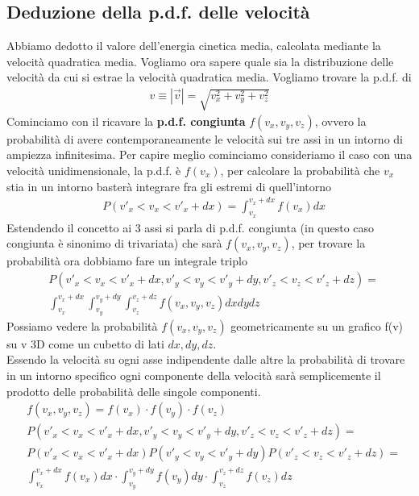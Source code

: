 \documentclass[10pt,a4paper]{article}
\begin{document}
\subsection{Deduzione della p.d.f. delle velocità}
Abbiamo dedotto il valore dell'energia cinetica media, calcolata mediante la velocità quadratica media. Vogliamo ora sapere quale sia la distribuzione delle velocità da cui si estrae la velocità quadratica media. Vogliamo trovare la p.d.f. di
\begin{align*}
	v \equiv |\vec{v}| = \sqrt{v_x^2+v_y^2+v_z^2}
\end{align*}
Cominciamo con il ricavare la \textbf{p.d.f. congiunta} $f(v_x, v_y, v_z)$, ovvero la probabilità di avere contemporaneamente le velocità sui tre assi in un intorno di ampiezza infinitesima. Per capire meglio cominciamo consideriamo il caso con una velocità unidimensionale, la p.d.f. è $f(v_x)$, per calcolare la probabilità che $v_x$ stia in un intorno basterà integrare fra gli estremi di quell'intorno
\begin{align*}
	& P(v'_x<v_x<v'_x+dx)= \int_{v_x}^{v_x+dx}f(v_x)dx
\end{align*}
Estendendo il concetto ai 3 assi si parla di p.d.f. congiunta (in questo caso congiunta è sinonimo di trivariata) che sarà $f(v_x, v_y, v_z)$, per trovare la probabilità ora dobbiamo fare un integrale triplo
\begin{align*}
	&P(v'_x<v_x<v'_x+dx, v'_y<v_y<v'_y+dy, v'_z<v_z<v'_z+dz) =\\
	&\int_{v_x}^{v_x+dx}\int_{v_y}^{v_y+dy}\int_{v_z}^{v_z+dz} f(v_x,v_y,v_z) dxdydz
\end{align*}
Possiamo vedere la probabilità $f(v_x, v_y, v_z)$ geometricamente su un grafico f(v) su v 3D come un cubetto di lati $dx, dy, dz$.\\
Essendo la velocità su ogni asse indipendente dalle altre la probabilità di trovare in un intorno specifico ogni componente della velocità sarà semplicemente il prodotto delle probabilità delle singole componenti.
\begin{align}\label{eq:cond1}
	&f(v_x, v_y, v_z) = f(v_x)\cdot f(v_y)\cdot f(v_z)\\
	& P(v'_x<v_x<v'_x+dx, v'_y<v_y<v'_y+dy, v'_z<v_z<v'_z+dz) =\nonumber\\ 
	&P(v'_x<v_x<v'_x+dx) P(v'_y<v_y<v'_y+dy) P(v'_z<v_z<v'_z+dz)=\nonumber\\
	&\int_{v_x}^{v_x+dx} f(v_x)dx \cdot \int_{v_y}^{v_y+dy}f(v_y)dy \cdot \int_{v_z}^{v_z+dz}f(v_z)dz\nonumber
\end{align}
\end{document}
